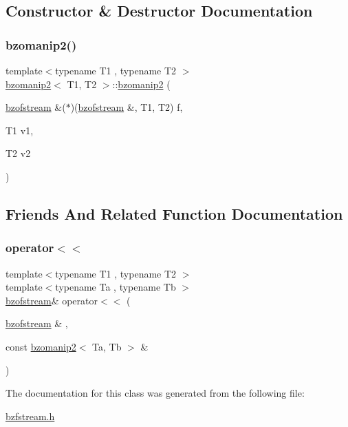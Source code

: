 \subsection{Constructor \& Destructor Documentation}
\mbox{\label{classbzomanip2_a7ae5b761a865198f14c3ea23d4a2b15c}} 
\subsubsection{\texorpdfstring{bzomanip2()}{bzomanip2()}}
{\footnotesize\ttfamily template$<$typename T1 , typename T2 $>$ \\
\hyperlink{classbzomanip2}{bzomanip2}$<$ T1, T2 $>$\+::\hyperlink{classbzomanip2}{bzomanip2} (\begin{DoxyParamCaption}\item[{\hyperlink{classbzofstream}{bzofstream} \&($\ast$)(\hyperlink{classbzofstream}{bzofstream} \&, T1, T2)}]{f,  }\item[{T1}]{v1,  }\item[{T2}]{v2 }\end{DoxyParamCaption})\hspace{0.3cm}{\ttfamily [inline]}}



\subsection{Friends And Related Function Documentation}
\mbox{\label{classbzomanip2_a7989b7dd1feaec2c5aebabd6af749f9e}} 
\subsubsection{\texorpdfstring{operator$<$$<$}{operator<<}}
{\footnotesize\ttfamily template$<$typename T1 , typename T2 $>$ \\
template$<$typename Ta , typename Tb $>$ \\
\hyperlink{classbzofstream}{bzofstream}\& operator$<$$<$ (\begin{DoxyParamCaption}\item[{\hyperlink{classbzofstream}{bzofstream} \&}]{,  }\item[{const \hyperlink{classbzomanip2}{bzomanip2}$<$ Ta, Tb $>$ \&}]{ }\end{DoxyParamCaption})\hspace{0.3cm}{\ttfamily [friend]}}



The documentation for this class was generated from the following file\+:\begin{DoxyCompactItemize}
\item 
\hyperlink{bzfstream_8h}{bzfstream.\+h}\end{DoxyCompactItemize}
